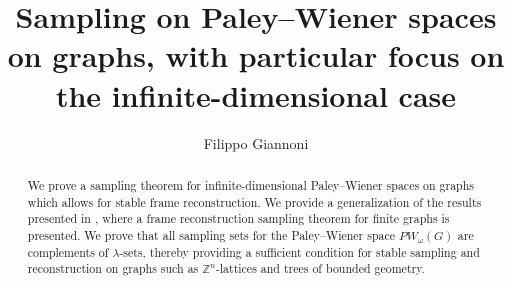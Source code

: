 \documentclass[12pt]{amsart}
\theoremstyle{definition}
\numberwithin{equation}{section}
\theoremstyle{definition}
\theoremstyle{remark}
\numberwithin{equation}{section}
\begin{document}
 \title[Sampling on infinite-dimensional PW spaces on graphs]{Sampling on Paley--Wiener spaces on graphs, with particular focus on the infinite-dimensional case}



\author[F.Giannoni]{Filippo Giannoni}
\address{Department of Mathematics, University of Sussex \\ Brighton, BN1 9QH \\ United Kingdom}
















\begin{abstract}
We prove a sampling theorem for infinite-dimensional Paley–Wiener spaces on graphs which allows for stable frame reconstruction. We provide a generalization of the results presented in \cite{PW1}, where a frame reconstruction sampling theorem for finite graphs is presented. We prove that all sampling sets for the Paley--Wiener space $PW_\omega(G)$ are complements of $\lambda$-sets, thereby providing a sufficient condition for stable sampling and reconstruction on graphs such as $\mathbb{Z}^n$-lattices and trees of bounded geometry.
\end{abstract}
\maketitle
\end{document}
